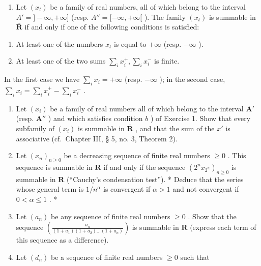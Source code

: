 \BourbakiExerciseGroup

\begin{enumerate}
\def\labelenumi{\arabic{enumi})}
\tightlist
\item
  Let \((x_{t})\) be a family of real numbers, all of which belong to the interval \(A' = ] - \infty, +\infty]\) (resp. \(A'' = [-\infty, +\infty[\) ). The family \((x_{t})\) is summable in \(\overline{\mathbf{R}}\) if and only if one of the following conditions is satisfied:
\end{enumerate}

\begin{enumerate}
\def\labelenumi{\alph{enumi})}
\item
  At least one of the numbers \(x_{t}\) is equal to \(+\infty\) (resp. \(-\infty\) ).
\item
  At least one of the two sums \(\sum_{i} x_{i}^{+}, \sum_{i} x_{i}^{-}\) is finite.
\end{enumerate}

In the first case we have \(\sum_{i} x_{i} = +\infty\) (resp. \(-\infty\) ); in the second case, \(\sum_{i} x_{i} = \sum_{i} x_{i}^{+} - \sum_{i} x_{i}^{-}\) .

\begin{enumerate}
\def\labelenumi{\arabic{enumi})}
\setcounter{enumi}{1}
\item
  Let \((x_{i})\) be a family of real numbers all of which belong to the interval \(\mathbf{A}'\) (resp. \(\mathbf{A}''\) ) and which satisfies condition \(b\) ) of Exercise 1. Show that every subfamily of \((x_{i})\) is summable in \(\overline{\mathbf{R}}\) , and that the sum of the \(x'\) is associative (cf.~Chapter III, § 5, no. 3, Theorem 2).
\item
  Let \((x_{n})_{n\geqslant 0}\) be a decreasing sequence of finite real numbers \(\geqslant 0\) . This sequence is summable in \(\mathbf{R}\) if and only if the sequence \((2^{n}x_{2^{n}})_{n\geqslant 0}\) is summable in \(\mathbf{R}\) (``Cauchy's condensation test''). * Deduce that the series whose general term is \(1 / n^{\alpha}\) is convergent if \(\alpha >1\) and not convergent if \(0 < \alpha \leqslant 1\) . *
\item
  Let \((a_{n})\) be any sequence of finite real numbers \(\geqslant 0\) . Show that the sequence \(\left(\frac{a_n}{(1 + a_1)(1 + a_2)\ldots(1 + a_n)}\right)\) is summable in \(\mathbf{R}\) (express each term of this sequence as a difference).
\item
  Let \((d_n)\) be a sequence of finite real numbers \(\geqslant 0\) such that
\end{enumerate}

